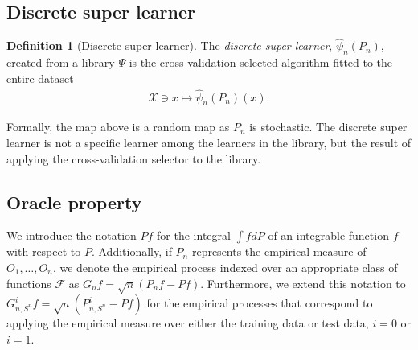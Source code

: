 \documentclass[11pt, a4paper]{article}
\theoremstyle{definition}
\newtheorem{definition}[theorem]{Definition}
\theoremstyle{remark}
\newcommand{\la}{\psi}
\newcommand{\Sn}{S^n}
\newcommand{\lib}{\Psi}
\begin{document}
\subsection{Discrete super learner}
\begin{definition}[Discrete super learner]
    The \textit{discrete super learner}, $ \hat{\la}_n(P_n) $, created from a library $ \lib $ is the cross-validation selected algorithm fitted to the entire dataset 
    \begin{align*}
        \mathcal{X} \ni x \mapsto \hat{\la}_n(P_n)(x). 
    \end{align*}
\end{definition}
Formally, the map above is a random map as $ P_n $ is stochastic. The discrete super learner is not a specific learner among the learners in the library, but the result of applying the cross-validation selector to the library. 

\subsection{Oracle property}
We introduce the notation $Pf$ for the integral $\int f dP$ of an integrable function $f$ with respect to $P$. Additionally, if $P_n$ represents the empirical measure of $O_1, \dots, O_n$, we denote the empirical process indexed over an appropriate class of functions $\mathcal{F}$ as $G_n f = \sqrt{n}(P_n f - P f)$. Furthermore, we extend this notation to $G_{n, \Sn}^{i} f = \sqrt{n}(P_{n, \Sn}^{i} - Pf)$ for the empirical processes that correspond to applying the empirical measure over either the training data or test data, $ i = 0 $ or $ i = 1 $.
\end{document}
